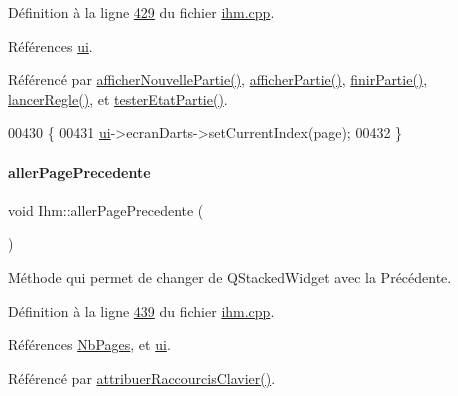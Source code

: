Définition à la ligne \hyperlink{ihm_8cpp_source_l00429}{429} du fichier \hyperlink{ihm_8cpp_source}{ihm.\+cpp}.



Références \hyperlink{ihm_8h_source_l00052}{ui}.



Référencé par \hyperlink{ihm_8cpp_source_l00383}{afficher\+Nouvelle\+Partie()}, \hyperlink{ihm_8cpp_source_l00333}{afficher\+Partie()}, \hyperlink{ihm_8cpp_source_l00365}{finir\+Partie()}, \hyperlink{ihm_8cpp_source_l00623}{lancer\+Regle()}, et \hyperlink{ihm_8cpp_source_l00641}{tester\+Etat\+Partie()}.


\begin{DoxyCode}
00430 \{
00431     \hyperlink{class_ihm_a0ac5f47856566ceeeca1720109bf70ea}{ui}->ecranDarts->setCurrentIndex(page);
00432 \}
\end{DoxyCode}
\mbox{\label{class_ihm_ac63f9c49fbde4482bb28e7f7e5882b25}} 
\paragraph{\texorpdfstring{aller\+Page\+Precedente}{allerPagePrecedente}}
{\footnotesize\ttfamily void Ihm\+::aller\+Page\+Precedente (\begin{DoxyParamCaption}{ }\end{DoxyParamCaption})\hspace{0.3cm}{\ttfamily [slot]}}



Méthode qui permet de changer de Q\+Stacked\+Widget avec la Précédente. 



Définition à la ligne \hyperlink{ihm_8cpp_source_l00439}{439} du fichier \hyperlink{ihm_8cpp_source}{ihm.\+cpp}.



Références \hyperlink{ihm_8h_source_l00078}{Nb\+Pages}, et \hyperlink{ihm_8h_source_l00052}{ui}.



Référencé par \hyperlink{ihm_8cpp_source_l00103}{attribuer\+Raccourcis\+Clavier()}.


